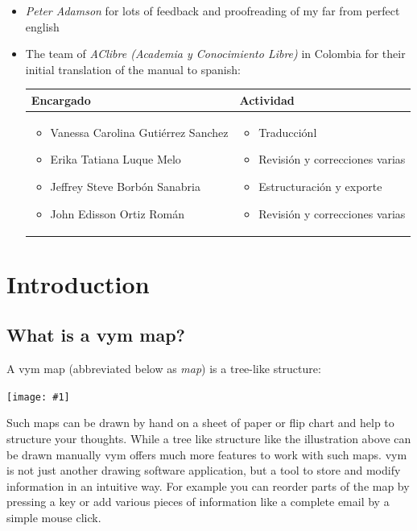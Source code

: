 \documentclass[12pt,a4paper]{article}
\newcommand{\maximage}[1]{  
    \begin{center}
        \texttt{[image: \#1]} 
    \end{center}
}
\newcommand{\vym}{{\sc vym }}
\begin{document}
\begin{itemize}
    \item {\em Peter Adamson} for lots of feedback and proofreading of my
          far from perfect english
    \item The team of {\em AClibre (Academia y Conocimiento Libre)}
          in Colombia for their initial translation of
          the manual to spanish:
          \begin{center}
            \begin{tabular}{|p{7cm}|p{5.5cm}|} \hline
                Encargado & Actividad \\ \hline
                \begin{itemize}
                   \item Vanessa Carolina Guti\'errez Sanchez
                   \item Erika Tatiana Luque Melo
                   \item Jeffrey Steve Borb\'on Sanabria
                   \item John Edisson Ortiz Rom\'an
                \end{itemize} &
                \begin{itemize}
                    \item Traducci\'onl
                    \item Revisi\'on y correcciones varias
                    \item Estructuraci\'on y exporte
                    \item Revisi\'on y correcciones varias
                \end{itemize}     \\ \hline
            \end{tabular}   
        \end{center}
\end{itemize}
\newpage


\section{Introduction}
\subsection{What is a \vym map?}
A \vym map (abbreviated below as {\em map}) is a tree-like structure:
\maximage{images/example1.png}
Such maps can be drawn by hand on a sheet of paper or flip chart and
help to structure your thoughts. While a tree like structure like the
illustration above can be drawn manually \vym offers much more features
to work with such maps.  \vym is not just another drawing software
application, but a tool to store and modify information in an intuitive
way. For example you can reorder parts of the map by pressing a key or
add various pieces of information like a complete email by a simple
mouse click.
\end{document}
